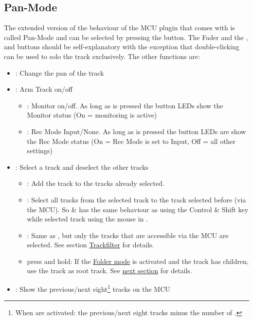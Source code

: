 \subsection{Pan-Mode}\label{panmode} 
The extended version of the behaviour of the MCU plugin that comes
with \reaper is called Pan-Mode and can be selected by pressing the \pan
button. The Fader and the \vpots,  \mute and \solo buttons should be
self-explanatory with the exception that double-clicking \solo can be
used to solo the track exclusively. The other functions are:

\begin{itemize}
\item \vpots: Change the pan of the track

\item \rec: Arm Track on/off
	\bemod
	\begin{itemize}
	\item \shift: Monitor on/off. As long as \shift is pressed the
          \solo button LEDs show the Monitor status (On = monitoring
          is active)
 	\item \option: Rec Mode Input/None. As long as \option is
          pressed the \solo button LEDs are show the Rec Mode
          status (On = Rec Mode is set to Input, Off = all other
          settings)
	\end{itemize}
	
\item \select: Select a track and deselect the other tracks
	\bemod 
	\begin{itemize}
	\item \control: Add the track to the tracks already selected.
	\item \shift: Select all tracks from the selected track to the
          track selected before (via the MCU). So \control \& \shift
          has the same behaviour as using the Control \& Shift key
          while selected track using the mouse in \reaper.
	\item \alt: Same as \shift, but only the tracks that are
          accessible via the MCU are selected. See section
          \hyperref[trackfilter]{Trackfilter} for details.
	\item press and hold: If the \hyperref[foldermode]{Folder
            mode} is activated and the track has children, use the
          track as root track. See \hyperref[foldermode]{next
            section} for details.
	\end{itemize}

\item \bankdu: Show the previous/next eight\footnote{When
\anchors are activated: the previous/next eight tracks minus the
number of \anchors.} tracks on the MCU


\end{itemize}
